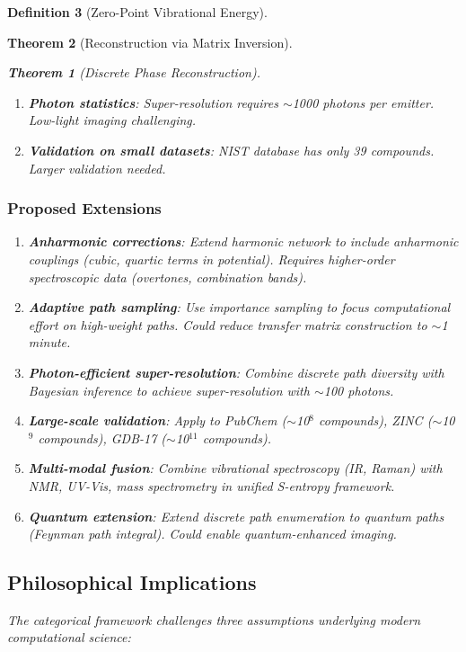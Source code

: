 \documentclass[11pt,a4paper]{article}
\newtheorem{theorem}{Theorem}[section]
\theoremstyle{definition}
\newtheorem{definition}[theorem]{Definition}
\theoremstyle{remark}
\begin{document}
\begin{definition}[Zero-Point Vibrational Energy]
\begin{theorem}[Reconstruction via Matrix Inversion]
\begin{theorem}[Discrete Phase Reconstruction]
\begin{enumerate}
\item \textbf{Photon statistics}: Super-resolution requires $\sim$1000 photons per emitter. Low-light imaging challenging.

\item \textbf{Validation on small datasets}: NIST database has only 39 compounds. Larger validation needed.
\end{enumerate}

\subsubsection{Proposed Extensions}

\begin{enumerate}
\item \textbf{Anharmonic corrections}: Extend harmonic network to include anharmonic couplings (cubic, quartic terms in potential). Requires higher-order spectroscopic data (overtones, combination bands).

\item \textbf{Adaptive path sampling}: Use importance sampling to focus computational effort on high-weight paths. Could reduce transfer matrix construction to $\sim$1 minute.

\item \textbf{Photon-efficient super-resolution}: Combine discrete path diversity with Bayesian inference to achieve super-resolution with $\sim$100 photons.

\item \textbf{Large-scale validation}: Apply to PubChem ($\sim$10$^8$ compounds), ZINC ($\sim$10$^9$ compounds), GDB-17 ($\sim$10$^{11}$ compounds).

\item \textbf{Multi-modal fusion}: Combine vibrational spectroscopy (IR, Raman) with NMR, UV-Vis, mass spectrometry in unified S-entropy framework.

\item \textbf{Quantum extension}: Extend discrete path enumeration to quantum paths (Feynman path integral). Could enable quantum-enhanced imaging.
\end{enumerate}

\subsection{Philosophical Implications}

The categorical framework challenges three assumptions underlying modern computational science:


\end{theorem}
\end{theorem}
\end{definition}
\end{document}
